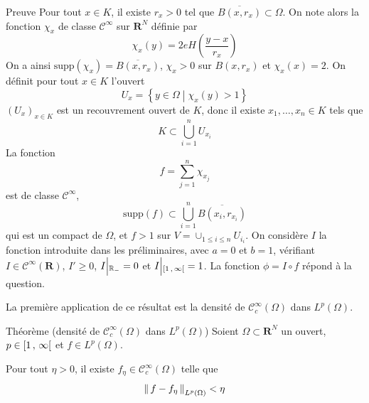         \begin{demo}{Preuve}
            Pour tout $x \in K$, il existe $r_{x} > 0$ tel que $\overline{B(x,r_x)} \subset \Omega$. On note alors la fonction $\chi_x$ de classe $\mathcal{C}^{\infty}$ sur $\mathbf{R}^N$ définie par 
            \[ \chi_x(y) = 2eH\left(\frac{y-x}{r_x}\right) \]
            On a ainsi $\text{supp}(\chi_x) = \overline{B(x, r_x)}$, $\chi_x > 0$ sur $B(x,r_x)$ et $\chi_x(x) = 2$. On définit pour tout $x \in K$ l’ouvert
            \[ U_x = \left\{y \in \Omega \middle| \chi_x(y) > 1\right\} \]
            $(U_x)_{x \in K}$ est un recouvrement ouvert de $K$, donc il existe $x_1, \ldots, x_n \in K$ tels que 
            \[ K \subset \bigcup_{i = 1}^n U_{x_i} \]   
            La fonction 
            \[ f = \sum_{j=1}^n \chi_{x_j} \]    
            est de classe $\mathcal{C}^{\infty}$, 
            \[ \text{supp}(f) \subset \bigcup_{i=1}^n \overline{B(x_i, r_{x_i})} \]   
            qui est un compact de $\Omega$, et $f > 1$ sur $V = \cup_{1 \leq i \leq n} U_{i_i}$. On considère $I$ la fonction introduite dans les préliminaires, avec $a = 0$ et $b = 1$, vérifiant $I \in \mathcal{C}^{\infty}(\mathbf{R})$, $I' \geq 0$, $I \Big|\vphantom{\big|}_{\mathbb{R_-}} = 0$ et $I \Big|\vphantom{\big|}_{\left[ 1 \, , \, \infty \right[} = 1$. La fonction $\phi = I \circ f$ répond à la question.
        \end{demo}

        La première application de ce résultat est la densité de $\mathcal{C}_c^{\infty}(\Omega)$ dans $L^p(\Omega)$.

        \begin{omed}{Théorème (densité de $\mathcal{C}_c^\infty(\Omega)$ dans $L^p(\Omega)$)}
            Soient $\Omega \subset \mathbf{R}^N$ un ouvert, $p \in \left[ 1 \, , \, \infty \right[$ et $f \in L^p(\Omega)$. 

            Pour tout $\eta > 0$, il existe $f_{\eta} \in \mathcal{C}_c^{\infty}(\Omega)$ telle que 
            \[ \left\lVert \, f - f_{\eta} \, \right\rVert_{L^p(\Omega)} < \eta \]   
        \end{omed}

